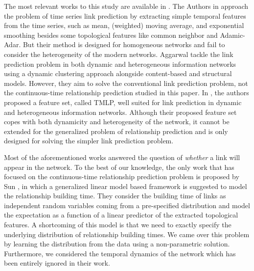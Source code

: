 The most relevant works to this study are available in \cite{hajibagheri2016leveraging, aggarwal2012dynamic, sett2017temporal, sun2012will}. The Authors in \cite{hajibagheri2016leveraging} approach the problem of time series link prediction by extracting simple temporal features from the time series, such as mean, (weighted) moving average, and exponential smoothing besides some topological features like common neighbor and Adamic-Adar. But their method is designed for homogeneous networks and fail to consider the heterogeneity of the modern networks. Aggarwal \etal{} \cite{aggarwal2012dynamic} tackle the link prediction problem in both dynamic and heterogeneous information networks using a dynamic clustering approach alongside content-based and structural models. However, they aim to solve the conventional link prediction problem, not the continuous-time relationship prediction studied in this paper. In \cite{sett2017temporal}, the authors proposed a feature set, called TMLP, well suited for link prediction in dynamic and heterogeneous information networks. Although their proposed feature set copes with both dynamicity and heterogeneity of the network, it cannot be extended for the generalized problem of relationship prediction and is only designed for solving the simpler link prediction problem.

Most of the aforementioned works answered the question of \emph{whether} a link will appear in the network. To the best of our knowledge, the only work that has focused on the continuous-time relationship prediction problem is proposed by Sun \etal{} \cite{sun2012will}, in which a generalized linear model based framework is suggested to model the relationship building time. They consider the building time of links as independent random variables coming from a pre-specified distribution and model the expectation as a function of a linear predictor of the extracted topological features. A shortcoming of this model is that we need to exactly specify the underlying distribution of relationship building times. We came over this problem by learning the distribution from the data using a non-parametric solution. Furthermore, we considered the temporal dynamics of the network which has been entirely ignored in their work.

